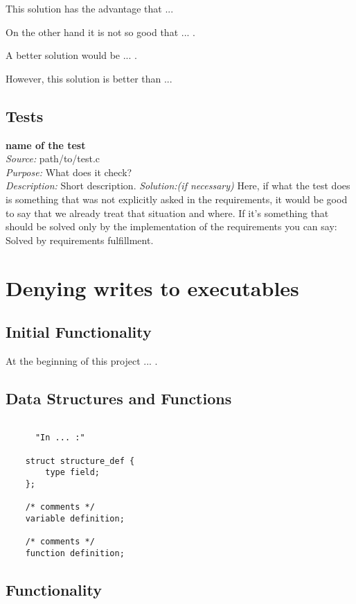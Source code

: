 	This solution has the advantage that ... 

	On the other hand it is not so good that ... . 

	A better solution would be ... . 

	However, this solution is better than ...

    \subsection{Tests}

    \textbf{name of the test}\\
    \textit{Source:} path/to/test.c\\
    \textit{Purpose:} What does it check?\\
    \textit{Description:} Short description.
    \textit{Solution:(if necessary)} Here, if what the test does is something that was not explicitly asked in the requirements, it would be good to say that we already treat that situation and where. If it's something that should be solved only by the implementation of the requirements you can say: Solved by requirements fulfillment.
	

\section{Denying writes to executables}

     \subsection{Initial Functionality}

	At the beginning of this project ... .

    \subsection{Data Structures and Functions}

    \begin{lstlisting}

      "In ... :"
	
	struct structure_def {
	    type field;
	};

	/* comments */
	variable definition;

	/* comments */
	function definition;

    \end{lstlisting}


    \subsection{Functionality}

